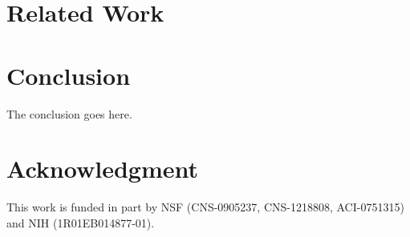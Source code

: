\documentclass[conference,compsoc]{IEEEtran}
\begin{document}
\section{Related Work}
\vspace{-0.1in}
\label{sec:related_work}


\vspace{-0.1in}
\section{Conclusion}
\vspace{-0.1in}
The conclusion goes here.

\vspace{-0.1in}
\section*{Acknowledgment}
\vspace{-0.1in}
This work is funded in part by NSF (CNS-0905237, CNS-1218808, ACI-0751315) and NIH
(1R01EB014877-01).

\vspace{-0.1in}

%

\end{document}
